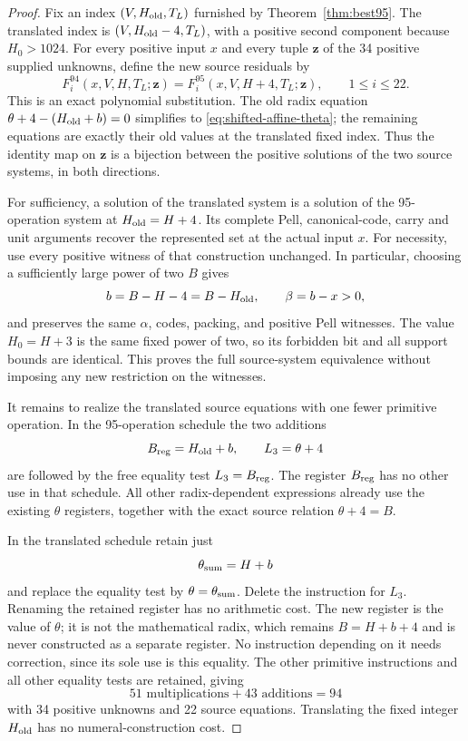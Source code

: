 \begin{proof}
Fix an index $(V,H_{\rm old},T_L)$ furnished by
Theorem~\ref{thm:best95}. The translated index is
$(V,H_{\rm old}-4,T_L)$, with a positive second component because
$H_0>1024$. For every positive input $x$ and every tuple $\mathbf z$
of the 34 positive supplied unknowns, define the new source
residuals by
\[
 F_i^{94}(x,V,H,T_L;\mathbf z)
   =F_i^{95}(x,V,H+4,T_L;\mathbf z),\qquad 1\le i\le22.
\]
This is an exact polynomial substitution. The old radix equation
$\theta+4-(H_{\rm old}+b)=0$ simplifies to
\eqref{eq:shifted-affine-theta}; the remaining equations are
exactly their old values at the translated fixed index. Thus the
identity map on $\mathbf z$ is a bijection between the positive
solutions of the two source systems, in both directions.

For sufficiency, a solution of the translated system is a solution
of the 95-operation system at $H_{\rm old}=H+4$. Its complete
Pell, canonical-code, carry and unit arguments recover the
represented set at the actual input $x$. For necessity, use every
positive witness of that construction unchanged. In particular,
choosing a sufficiently large power of two $B$ gives
\[
 b=B-H-4=B-H_{\rm old},\qquad\beta=b-x>0,
\]
and preserves the same $\alpha$, codes, packing, and positive
Pell witnesses. The value $H_0=H+3$ is the same fixed power of
two, so its forbidden bit and all support bounds are identical.
This proves the full source-system equivalence without imposing
any new restriction on the witnesses.

It remains to realize the translated source equations with one
fewer primitive operation. In the 95-operation schedule the
two additions
\[
 B_{\rm reg}=H_{\rm old}+b,\qquad L_3=\theta+4
\]
are followed by the free equality test $L_3=B_{\rm reg}$.
The register $B_{\rm reg}$ has no other use in that schedule.
All other radix-dependent expressions already use the existing
$\theta$ registers, together with the exact source relation
$\theta+4=B$.

In the translated schedule retain just
\[
 \theta_{\rm sum}=H+b
\]
and replace the equality test by $\theta=\theta_{\rm sum}$.
Delete the instruction for $L_3$. Renaming the retained register
has no arithmetic cost. The new register is the value
of $\theta$; it is not the mathematical radix, which remains
$B=H+b+4$ and is never constructed as a separate register.
No instruction depending on it needs correction,
since its sole use is this equality. The other primitive
instructions and all other equality tests are retained, giving
\[
 51\text{ multiplications}+43\text{ additions}=94
\]
with 34 positive unknowns and 22 source equations. Translating
the fixed integer $H_{\rm old}$ has no numeral-construction cost.
\end{proof}

